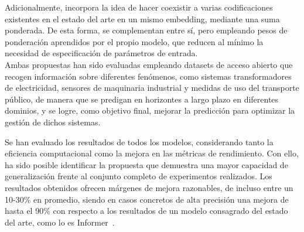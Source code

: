 Adicionalmente, incorpora la idea de hacer coexistir a varias codificaciones existentes en el estado del arte en un mismo embedding, mediante una suma ponderada. De esta forma, se complementan entre sí, pero empleando pesos de ponderación aprendidos por el propio modelo, que reducen al mínimo la necesidad de especificación de parámetros de entrada.\\
Ambas propuestas han sido evaluadas empleando datasets de acceso abierto que recogen información sobre diferentes fenómenos, como sistemas transformadores de electricidad, sensores de maquinaria industrial y medidas de uso del transporte público, de manera que se predigan en horizontes a largo plazo en diferentes dominios, y se logre, como objetivo final, mejorar la predicción para optimizar la gestión de dichos sistemas.\vspace{0.35em}

Se han evaluado los resultados de todos los modelos, considerando tanto la eficiencia computacional como la mejora en las métricas de rendimiento. Con ello, ha sido posible identificar la propuesta que demuestra una mayor capacidad de generalización frente al conjunto completo de experimentos realizados. Los resultados obtenidos ofrecen márgenes de mejora razonables, de incluso entre un 10-30\%  en promedio, siendo en casos concretos de alta precisión una mejora de hasta el 90\% con respecto a los resultados de un modelo consagrado del estado del arte, como lo es Informer~\cite{zhou2021informerefficienttransformerlong}. 

